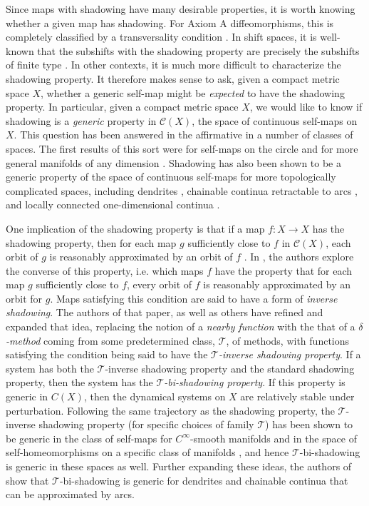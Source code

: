\documentclass{amsart}
\numberwithin{equation}{section}
\begin{document}
Since maps with shadowing have many desirable properties, it is worth knowing whether a given map has shadowing. For Axiom A diffeomorphisms, this is completely classified by a transversality condition \cite{robinson1977stability}. In shift spaces, it is well-known that the subshifts with the shadowing property are precisely the subshifts of finite type \cite{Walters1978}. In other contexts, it is much more difficult to characterize the shadowing property. It therefore makes sense to ask, given a compact metric space $X$, whether a generic self-map might be \emph{expected} to have the shadowing property. In particular, given a compact metric space $X$, we would like to know if shadowing is a \emph{generic} property in $\mathcal C(X)$, the space of continuous self-maps on $X$. This question has been answered in the affirmative in a number of classes of spaces. The first results of this sort were for self-maps on the circle \cite{yano1987generic} and for more general manifolds of any dimension \cite{genericshadowingmanifolds1999}. Shadowing has also been shown to be a generic property of the space of continuous self-maps for more topologically complicated spaces, including dendrites \cite{Shadowinggenericdendrites}, chainable continua retractable to arcs \cite{bishadowgenericoprocha}, and locally connected one-dimensional continua \cite{genericshadowingmeddaugh}.  

One implication of the shadowing property is that if a map $f:X\to X$ has the shadowing property, then for each map $g$ sufficiently close to $f$ in $\mathcal C(X)$, each orbit of $g$ is reasonably approximated by an orbit of $f$ \cite{ShadowingasStructural}. In \cite{weakshadowignintroduced}, the authors explore the converse of this property, i.e. which maps $f$ have the property that for each map $g$ sufficiently close to $f$, every orbit of $f$ is reasonably approximated by an orbit for $g$. Maps satisfying this condition are said to have a form of \emph{inverse shadowing}. The authors of that paper, as well as others  \cite{Inverseshadowinggenericvarious} have refined and expanded that idea, replacing the notion of a \emph{nearby function} with the that of a \emph{$\delta$-method} coming from some predetermined class, $\mathcal T$, of methods, with functions satisfying the condition being said to have the \emph{$\mathcal T$-inverse shadowing property}. If a system has both the $\mathcal T$-inverse shadowing property and the standard shadowing property, then the system has the \emph{$\mathcal T$-bi-shadowing property}. If this property is generic in $C(X)$, then the dynamical systems on $X$ are relatively stable under perturbation. Following the same trajectory as the shadowing property, the $\mathcal T$-inverse shadowing property (for specific choices of family $\mathcal T$) has been shown to be generic in the class of self-maps for $C^\infty$-smooth manifolds \cite{weakshadowignintroduced} and in the space of self-homeomorphisms on a specific class of manifolds \cite{Inverseshadowinggenericvarious}, and hence $\mathcal T$-bi-shadowing is generic in these spaces as well. Further expanding these ideas, the authors of \cite{bishadowgenericoprocha} show that $\mathcal T$-bi-shadowing is generic for dendrites and chainable continua that can be approximated by arcs. 
\end{document}
